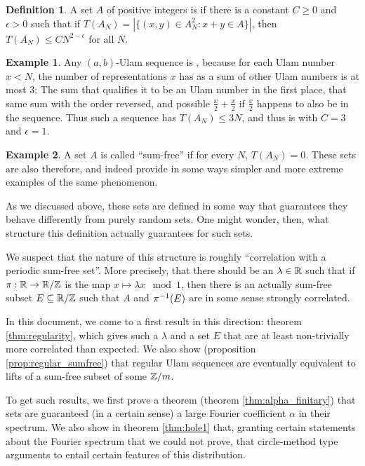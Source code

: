 \documentclass{article}
\theoremstyle{definition}
\newtheorem{definition}{Definition}
\newtheorem{example}{Example}
\theoremstyle{remark}
\numberwithin{equation}{section}
\begin{document}
\begin{definition}A set $A$ of positive integers is
  \textbf{\relevant}if there is a constant $C \geq 0$ and $\epsilon > 0$
  such that if $T(A_N) = |\{(x, y)\in A_N^2 : x + y \in A\}|$, then
  $T(A_N) \leq C N^{2-\epsilon}$ for all $N$.  
\end{definition}

\begin{example}
  Any $(a,b)$-Ulam sequence is \relevant, because for each Ulam number
  $x < N$, the number of representations $x$ has as a sum of other
  Ulam numbers is at most 3: The sum that qualifies it to be an Ulam
  number in the first place, that same sum with the order reversed,
  and possible $\frac{x}{2} + \frac{x}{2}$ if $\frac{x}{2}$ happens to
  also be in the sequence.  Thus such a sequence has $T(A_N) \leq 3N$,
  and thus is \relevant with $C = 3$ and $\epsilon = 1$.
\end{example}

\begin{example}
  A set $A$ is called ``sum-free'' if for every $N$, $T(A_N) = 0$.
  These sets are also \relevant therefore, and indeed provide in some
  ways simpler and more extreme examples of the same phenomenon.  
\end{example}

As we discussed above, these sets are defined in some way that
guarantees they behave differently from purely random sets.  One might
wonder, then, what structure this definition actually guarantees for
such sets.

We suspect that the nature of this structure is roughly ``correlation
with a periodic sum-free set''.  More precisely, that there should be
an $\lambda \in \mathbb{R}$ such that if $\pi : \mathbb{R} \to \mathbb{R}/\mathbb{Z}$ is the map
$x \mapsto \lambda x\mod{1}$, then there is an actually sum-free
subset $E \subseteq \mathbb{R}/\mathbb{Z}$ such that $A$ and $\pi^{-1}(E)$ are in some
sense strongly correlated.  

In this document, we come to a first result in this direction: theorem
\ref{thm:regularity}, which gives such a $\lambda$ and a set $E$ that
are at least non-trivially more correlated than expected.  We also
show (proposition \ref{prop:regular_sumfree}) that regular Ulam
sequences are eventually equivalent to lifts of a sum-free subset of
some $\mathbb{Z}/m$.  

To get such results, we first prove a theorem (theorem
\ref{thm:alpha_finitary}) that \relevant sets are guaranteed (in a
certain sense) a large Fourier coefficient $\alpha$ in their spectrum.
We also show in theorem \ref{thm:hole1} that, granting certain
statements about the Fourier spectrum that we could not prove, that
circle-method type arguments to entail certain features of this
distribution.  
\end{document}
